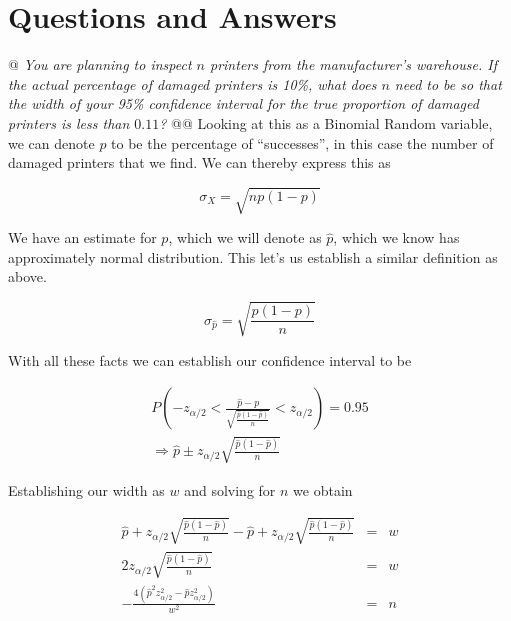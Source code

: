 \documentclass[10pt]{report}\usepackage[]{graphicx}\usepackage[]{xcolor}
\begin{document}
\section{Questions and Answers}
    \begin{easylist}[enumerate]
        @ \textit{You are planning to inspect $n$ printers from the manufacturer's warehouse. If the actual percentage
        of damaged printers is 10\%, what does $n$ need to be so that the width of your 95\% confidence interval for the
        true proportion of damaged printers is less than $0.11$?}
        @@ Looking at this as a Binomial Random variable, we can denote $p$ to be the percentage of ``successes'', in this
        case the number of damaged printers that we find. We can thereby express this as

        \[
            \sigma_X = \sqrt{np (1 - p)}
        \]

        We have an estimate for $p$, which we will denote as $\hat{p}$, which we know has approximately normal
        distribution. This let's us establish a similar definition as above.

        \[
            \sigma_{\hat{p}} = \sqrt{\frac{p(1-p)}{n}}
        \]

        With all these facts we can establish our confidence interval to be

        \[
            \begin{aligned}
                P \left( -z_{\alpha/2} <
                    \frac{\hat{p} - p}{\sqrt{\frac{\hat{p}\left(1-\hat{p}\right)}{n}}} <
                    z_{\alpha/2} \right) = 0.95\\
                \Rightarrow \hat{p} \pm z_{\alpha/2} \sqrt{\frac{\hat{p} (1 - \hat{p})}{n}}
            \end{aligned}
        \]

        Establishing our width as $w$ and solving for $n$ we obtain

        \[
            \begin{aligned}
                \hat{p} + z_{\alpha/2} \sqrt{\frac{\hat{p} (1 - \hat{p})}{n}} -
                    \hat{p} + z_{\alpha/2} \sqrt{\frac{\hat{p} (1 - \hat{p})}{n}} &=& w\\
                2 z_{\alpha/2} \sqrt{\frac{\hat{p} (1 - \hat{p})}{n}} &=& w\\
                -\frac{4 \left(\hat{p}^2 z_{\alpha / 2}^2-\hat{p} z_{\alpha / 2}^2\right)}{w^2} &=& n
            \end{aligned}
        \]


\end{easylist}
\end{document}
